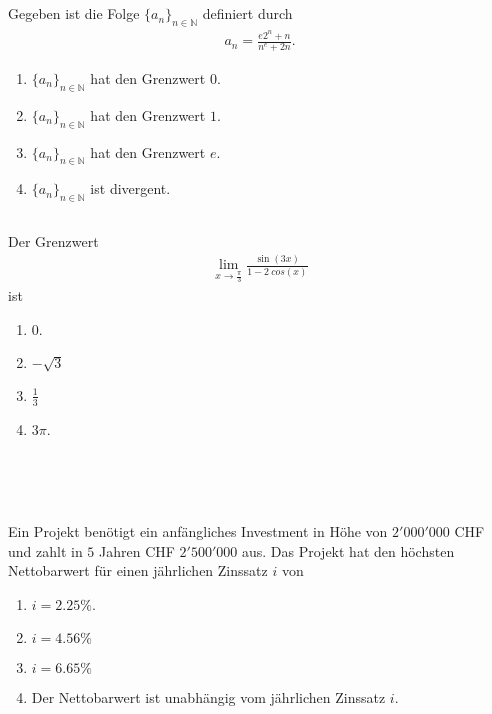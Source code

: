\subsection*{}
Gegeben ist die Folge $ \lbrace a_n \rbrace_{n \in \mathbb{N}}$
definiert durch
\begin{align*}
a_n = \frac{e  2^n + n}{n^e + 2n}.
\end{align*}
\renewcommand{\labelenumi}{(\alph{enumi})}
\begin{enumerate}
\item $ \lbrace a_n \rbrace_{n \in \mathbb{N}}$ hat den Grenzwert $0$.
\item $ \lbrace a_n \rbrace_{n \in \mathbb{N}}$ hat den Grenzwert $1$.
\item $ \lbrace a_n \rbrace_{n \in \mathbb{N}}$ hat den Grenzwert $e$.
\item $ \lbrace a_n \rbrace_{n \in \mathbb{N}}$ ist divergent.
\end{enumerate}
\newpage
\subsection*{}
Der Grenzwert 
\begin{align*}
\lim \limits_{x \rightarrow \frac{\pi}{3}}
\frac{\sin(3x)}{1 - 2 \ cos(x)}
\end{align*}
ist
\renewcommand{\labelenumi}{(\alph{enumi})}
\begin{enumerate}
\item $0$.
\item $- \sqrt{3}$
\item $\frac{1}{3}$
\item $3 \pi$.
\end{enumerate}
\ \\
\\
\subsection*{}
Ein Projekt benötigt ein anfängliches Investment in Höhe von $2'000'000$ CHF und zahlt in $5$ Jahren CHF $2'500'000$ aus.
Das Projekt hat den höchsten Nettobarwert für einen jährlichen
Zinssatz $i$ von
\renewcommand{\labelenumi}{(\alph{enumi})}
\begin{enumerate}
\item $i = 2.25 \%$.
\item $i = 4.56 \%$
\item $i = 6.65 \%$
\item Der Nettobarwert ist unabhängig vom jährlichen Zinssatz $i$.
\end{enumerate}
\ \\
\\
